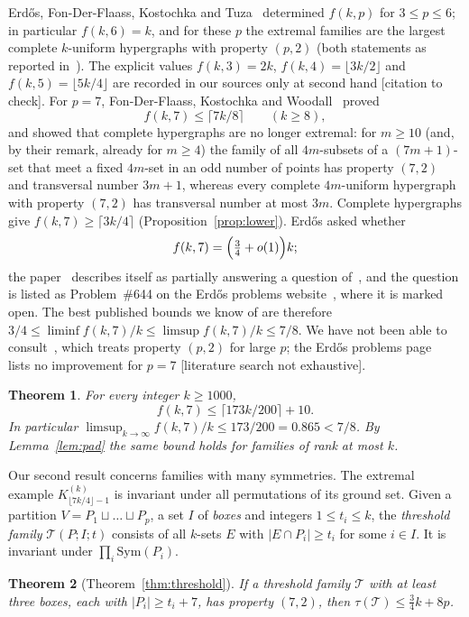 \documentclass[11pt]{amsart}
\newtheorem{theorem}{Theorem}[section]
\theoremstyle{definition}
\theoremstyle{remark}
\newcommand{\ceil}[1]{\lceil #1\rceil}
\newcommand{\floor}[1]{\lfloor #1\rfloor}
\begin{document}
Erd\H{o}s, Fon-Der-Flaass, Kostochka and Tuza~\cite{EFKT} determined $f(k,p)$ for $3\le p\le6$; in particular $f(k,6)=k$, and for these $p$ the extremal families are the largest complete $k$-uniform hypergraphs with property $(p,2)$ (both statements as reported in~\cite{FKW}). The explicit values $f(k,3)=2k$, $f(k,4)=\floor{3k/2}$ and $f(k,5)=\floor{5k/4}$ are recorded in our sources only at second hand [citation to check]. For $p=7$, Fon-Der-Flaass, Kostochka and Woodall~\cite{FKW} proved
\[
f(k,7)\le\ceil{7k/8}\qquad(k\ge8),
\]
and showed that complete hypergraphs are no longer extremal: for $m\ge10$ (and, by their remark, already for $m\ge4$) the family of all $4m$-subsets of a $(7m+1)$-set that meet a fixed $4m$-set in an odd number of points has property $(7,2)$ and transversal number $3m+1$, whereas every complete $4m$-uniform hypergraph with property $(7,2)$ has transversal number at most $3m$. Complete hypergraphs give $f(k,7)\ge\ceil{3k/4}$ (Proposition~\ref{prop:lower}). Erd\H{o}s asked whether
\[
f(k,7)=\Bigl(\tfrac34+o(1)\Bigr)k ;
\]
the paper~\cite{FKW} describes itself as partially answering a question of~\cite{EFKT}, and the question is listed as Problem~\#644 on the Erd\H{o}s problems website~\cite{EP}, where it is marked open. The best published bounds we know of are therefore $3/4\le\liminf f(k,7)/k\le\limsup f(k,7)/k\le7/8$. We have not been able to consult~\cite{Kos}, which treats property $(p,2)$ for large $p$; the Erd\H{o}s problems page~\cite{EP} lists no improvement for $p=7$ [literature search not exhaustive].

\begin{theorem}\label{thm:main}
For every integer $k\ge1000$,
\[
f(k,7)\le\ceil{173k/200}+10 .
\]
In particular $\limsup_{k\to\infty}f(k,7)/k\le173/200=0.865<7/8$. By Lemma~\ref{lem:pad} the same bound holds for families of rank at most $k$.
\end{theorem}

Our second result concerns families with many symmetries. The extremal example $K^{(k)}_{\lfloor7k/4\rfloor-1}$ is invariant under all permutations of its ground set. Given a partition $V=P_1\sqcup\dots\sqcup P_p$, a set $I$ of \emph{boxes} and integers $1\le t_i\le k$, the \emph{threshold family} $\mathcal T(P;I;t)$ consists of all $k$-sets $E$ with $|E\cap P_i|\ge t_i$ for some $i\in I$. It is invariant under $\prod_i\mathrm{Sym}(P_i)$.

\begin{theorem}[Theorem~\ref{thm:threshold}]\label{thm:intro-threshold}
If a threshold family $\mathcal T$ with at least three boxes, each with $|P_i|\ge t_i+7$, has property $(7,2)$, then $\tau(\mathcal T)\le\frac34k+8p$.
\end{theorem}
\end{document}
